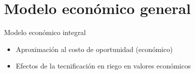 \documentclass{beamer}\usepackage[]{graphicx}\usepackage[]{color}
\begin{document}



\section{Modelo económico general}
\begin{frame}{Modelo económico integral} \vspace{2pt}
    \begin{itemize}
\pause \item Aproximación al costo de oportunidad (económico)
\pause \item Efectos de la tecnificación en riego en valores económicos
    \end{itemize}
\end{frame}
\end{document}
